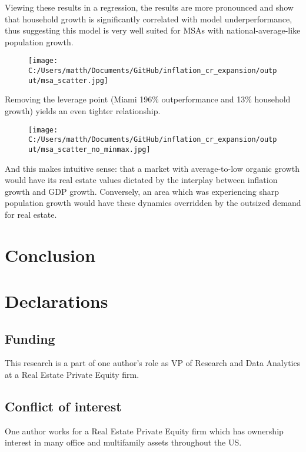 Viewing these results in a regression, the results are more pronounced and show that household growth is significantly correlated with model underperformance, thus suggesting this model is very well suited for MSAs with national-average-like population growth. 

\begin{figure}[H]
\texttt{[image: C:/Users/matth/Documents/GitHub/inflation\_cr\_expansion/output/msa\_scatter.jpg]}
\end{figure}

Removing the leverage point (Miami 196\% outperformance and 13\% household growth) yields an even tighter relationship.

\begin{figure}[H]
\texttt{[image: C:/Users/matth/Documents/GitHub/inflation\_cr\_expansion/output/msa\_scatter\_no\_minmax.jpg]}
\end{figure}

And this makes intuitive sense: that a market with average-to-low organic growth would have its real estate values dictated by the interplay between inflation growth and GDP growth. Conversely, an area which was experiencing sharp population growth would have these dynamics overridden by the outsized demand for real estate.
\pagebreak

\section{Conclusion}


%
\section*{Declarations}
\subsection{Funding}
This research is a part of one author's role as VP of Research and Data Analytics at a Real Estate Private Equity firm. 

\subsection{Conflict of interest}
One author works for a Real Estate Private Equity firm which has ownership interest in many office and multifamily assets throughout the US. 

